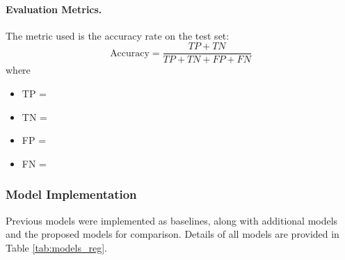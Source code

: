 \documentclass[12pt]{article}
\begin{document}
\paragraph{Evaluation Metrics.}
The metric used is the accuracy rate on the test set:
\[
\text{Accuracy} = \frac{TP + TN}{TP + TN + FP + FN}
\]
where
\begin{itemize}
    \item TP = 
    \item TN = 
    \item FP = 
    \item FN = 
\end{itemize}

\subsubsection{Model Implementation}
Previous models were implemented as baselines, along with additional models and the proposed models for comparison. 
Details of all models are provided in Table \ref{tab:models_reg}.
\end{document}
